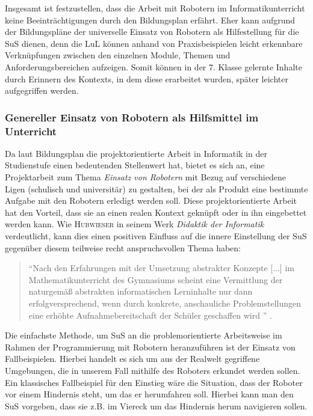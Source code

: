 \documentclass[paper=a4, DIV=calc, BCOR=12mm, twoside=on, onecolumn=on, open = right, titlepage =on, parskip =half-, headsepline = on, footsepline = off, chapterprefix = off, appendixprefix = on, fontsize = 12pt, numbers = noenddot, abstract = on]{scrbook}
\begin{document}
\vspace*{2ex}
Insgesamt ist festzustellen, dass die Arbeit mit Robotern im Informatikunterricht keine Beeinträchtigungen durch den Bildungsplan erfährt. Eher kann aufgrund der Bildungspläne der universelle Einsatz von Robotern als Hilfestellung für die SuS dienen, denn die LuL können anhand von Praxisbeispielen leicht erkennbare Verknüpfungen zwischen den einzelnen Module, Themen und Anforderungsbereichen aufzeigen. Somit können in der 7. Klasse gelernte Inhalte durch Erinnern des Kontexts, in dem diese erarbeitet wurden, später leichter aufgegriffen werden.

\vspace*{-2ex}
\subsubsection{Genereller Einsatz von Robotern als Hilfsmittel im Unterricht}
Da laut Bildungsplan die projektorientierte Arbeit in Informatik in der Studienstufe einen bedeutenden Stellenwert hat, bietet es sich an, eine Projektarbeit zum Thema \emph{Einsatz von Robotern} mit Bezug auf verschiedene Ligen (schulisch und universitär) zu gestalten, bei der als Produkt eine bestimmte Aufgabe mit den Robotern erledigt werden soll.  Diese projektorientierte Arbeit hat den Vorteil, dass sie an einen realen Kontext geknüpft oder in ihn eingebettet werden kann. Wie \textsc{Hubwieser} in seinem Werk \emph{Didaktik der Informatik} verdeutlicht, kann dies einen positiven Einfluss auf die innere Einstellung der SuS gegenüber diesem teilweise recht anspruchsvollen Thema haben:
\begin{quote}
"`Nach den Erfahrungen mit der Umsetzung abstrakter Konzepte [...] im Mathematikunterricht des Gymnasiums scheint eine Vermittlung der naturgemäß abstrakten informatischen Lerninhalte nur dann erfolgversprechend, wenn durch konkrete, anschauliche Problemstellungen eine erhöhte Aufnahmebereitschaft der Schüler geschaffen wird "' \cite[S.68]{hubwieser:07}.
\end{quote}

Die einfachste Methode, um SuS an die problemorientierte Arbeitsweise im Rahmen der Programmierung mit Robotern heranzuführen ist der Einsatz von Fallbeispielen. Hierbei handelt es sich um aus der Realwelt gegriffene Umgebungen, die in unserem Fall mithilfe des Roboters erkundet werden sollen. Ein klassisches Fallbeispiel für den Einstieg wäre die Situation, dass der Roboter vor einem Hindernis steht, um das er herumfahren soll. Hierbei kann man den SuS vorgeben, dass sie z.B. im Viereck um das Hindernis herum navigieren sollen.
\end{document}
